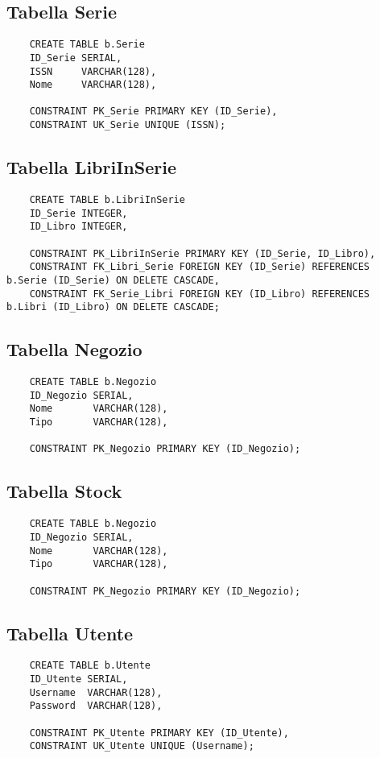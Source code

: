 \subsection{Tabella Serie}
\begin{lstlisting}
    CREATE TABLE b.Serie
    ID_Serie SERIAL,
    ISSN     VARCHAR(128),
    Nome     VARCHAR(128),

    CONSTRAINT PK_Serie PRIMARY KEY (ID_Serie),
    CONSTRAINT UK_Serie UNIQUE (ISSN);
\end{lstlisting}

\newpage

\subsection{Tabella LibriInSerie}
\begin{lstlisting}
    CREATE TABLE b.LibriInSerie
    ID_Serie INTEGER,
    ID_Libro INTEGER,

    CONSTRAINT PK_LibriInSerie PRIMARY KEY (ID_Serie, ID_Libro),
    CONSTRAINT FK_Libri_Serie FOREIGN KEY (ID_Serie) REFERENCES b.Serie (ID_Serie) ON DELETE CASCADE,
    CONSTRAINT FK_Serie_Libri FOREIGN KEY (ID_Libro) REFERENCES b.Libri (ID_Libro) ON DELETE CASCADE;
\end{lstlisting}

\subsection{Tabella Negozio}
\begin{lstlisting}
    CREATE TABLE b.Negozio
    ID_Negozio SERIAL,
    Nome       VARCHAR(128),
    Tipo       VARCHAR(128),

    CONSTRAINT PK_Negozio PRIMARY KEY (ID_Negozio);
\end{lstlisting}

\subsection{Tabella Stock}
\begin{lstlisting}
    CREATE TABLE b.Negozio
    ID_Negozio SERIAL,
    Nome       VARCHAR(128),
    Tipo       VARCHAR(128),

    CONSTRAINT PK_Negozio PRIMARY KEY (ID_Negozio);
\end{lstlisting}

\subsection{Tabella Utente}
\begin{lstlisting}
    CREATE TABLE b.Utente
    ID_Utente SERIAL,
    Username  VARCHAR(128),
    Password  VARCHAR(128),

    CONSTRAINT PK_Utente PRIMARY KEY (ID_Utente),
    CONSTRAINT UK_Utente UNIQUE (Username);
\end{lstlisting}

